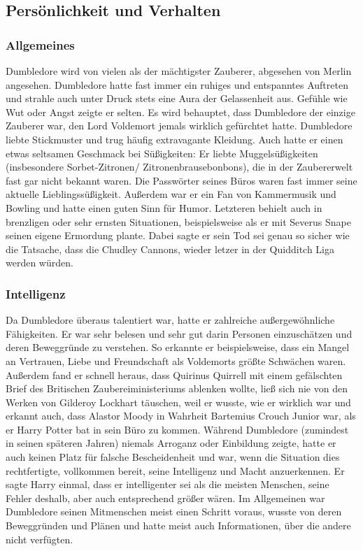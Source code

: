 \documentclass[a4paper, 10pt]{article}
\begin{document}
\subsection*{\Large Persönlichkeit und Verhalten}
\subsubsection*{\large Allgemeines}
Dumbledore wird von vielen als der mächtigster Zauberer, abgesehen von Merlin angesehen. Dumbledore hatte fast immer ein ruhiges und entspanntes Auftreten und strahle auch unter Druck stets eine Aura der Gelassenheit aus. Gefühle wie Wut oder Angst zeigte er selten. Es wird behauptet, dass Dumbledore der einzige Zauberer war, den Lord Voldemort jemals wirklich gefürchtet hatte.
\vspace{10pt}
\newline
Dumbledore liebte Stickmuster und trug häufig extravagante Kleidung. Auch hatte er einen etwas seltsamen Geschmack bei Süßigkeiten: Er liebte Muggelsüßigkeiten (insbesondere Sorbet-Zitronen/ Zitronenbrausebonbons), die in der Zaubererwelt fast gar nicht bekannt waren. Die Passwörter seines Büros waren fast immer seine aktuelle Lieblingssüßigkeit. Außerdem war er ein Fan von Kammermusik und Bowling und hatte einen guten Sinn für Humor. Letzteren behielt auch in brenzligen oder sehr ernsten Situationen, beispielsweise als er mit Severus Snape seinen eigene Ermordung plante. Dabei sagte er sein Tod sei genau so sicher wie die Tatsache, dass die Chudley Cannons, wieder letzer in der Quidditch Liga werden würden.
\subsubsection*{\large Intelligenz}
Da Dumbledore überaus talentiert war, hatte er zahlreiche außergewöhnliche Fähigkeiten. Er war sehr belesen und sehr gut darin Personen einzuschätzen und deren Beweggründe zu verstehen. So erkannte er beispielsweise, dass ein Mangel an Vertrauen, Liebe und Freundschaft als Voldemorts größte Schwächen waren. Außerdem fand er schnell heraus, dass Quirinus Quirrell mit einem gefälschten Brief des Britischen Zaubereiministeriums ablenken wollte, ließ sich nie von den Werken von Gilderoy Lockhart täuschen, weil er wusste, wie er wirklich war und erkannt auch, dass Alastor Moody in Wahrheit Bartemius Crouch Junior war, als er Harry Potter bat in sein Büro zu kommen.
\vspace{10pt}
\newline
Während Dumbledore (zumindest in seinen späteren Jahren) niemals Arroganz oder Einbildung zeigte, hatte er auch keinen Platz für falsche Bescheidenheit und war, wenn die Situation dies rechtfertigte, vollkommen bereit, seine Intelligenz und Macht anzuerkennen. Er sagte Harry einmal, dass er intelligenter sei als die meisten Menschen, seine Fehler deshalb, aber auch entsprechend größer wären.
\vspace{10pt}
\newline
Im Allgemeinen war Dumbledore seinen Mitmenschen meist einen Schritt voraus, wusste von deren Beweggründen und Plänen und hatte meist auch Informationen, über die andere nicht verfügten.
\end{document}
